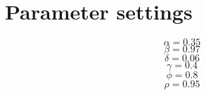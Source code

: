\section{Parameter settings}

\begin{equation}
\alpha = 0.35
\end{equation}
\begin{equation}
\beta = 0.97
\end{equation}
\begin{equation}
\delta = 0.06
\end{equation}
\begin{equation}
\gamma = 0.4
\end{equation}
\begin{equation}
\phi = 0.8
\end{equation}
\begin{equation}
\rho = 0.95
\end{equation}


